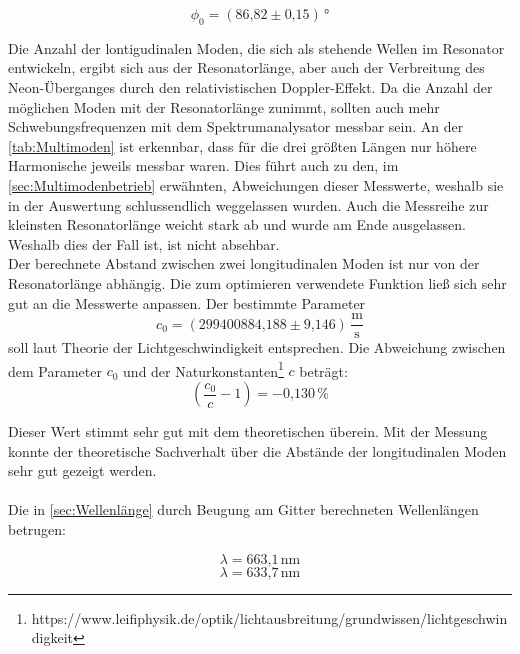 \begin{equation}
\phi_0 = (\text{86,82} \pm \text{0,15})\,\text{°}
\end{equation}


Die Anzahl der lontigudinalen Moden, die sich als stehende Wellen im Resonator entwickeln, ergibt sich aus der Resonatorlänge, aber auch der Verbreitung des Neon-Überganges durch den relativistischen Doppler-Effekt. Da die Anzahl der möglichen Moden mit der Resonatorlänge zunimmt, sollten auch mehr Schwebungsfrequenzen mit dem Spektrumanalysator messbar sein. An der \autoref{tab:Multimoden} ist erkennbar, dass für die drei größten Längen nur höhere Harmonische jeweils messbar waren. Dies führt auch zu den, im \autoref{sec:Multimodenbetrieb} erwähnten, Abweichungen dieser Messwerte, weshalb sie in der Auswertung schlussendlich weggelassen wurden. Auch die Messreihe zur kleinsten Resonatorlänge weicht stark ab und wurde am Ende ausgelassen. Weshalb dies der Fall ist, ist nicht absehbar.\\
Der berechnete Abstand zwischen zwei longitudinalen Moden ist nur von der Resonatorlänge abhängig. Die zum optimieren verwendete Funktion ließ sich sehr gut an die Messwerte anpassen. Der bestimmte Parameter
\begin{equation}
c_0 = (\text{299400884,188} \pm \text{9,146})\, \frac{\text{m}}{\text{s}}
\end{equation}
soll laut Theorie der Lichtgeschwindigkeit entsprechen. Die Abweichung zwischen dem Parameter $c_0$ und der Naturkonstanten\footnote{https://www.leifiphysik.de/optik/lichtausbreitung/grundwissen/lichtgeschwindigkeit} $c$ beträgt:
\begin{equation}
(\frac{c_0}{c} -1)= -\text{0,130}\,\%
\end{equation}

Dieser Wert stimmt sehr gut mit dem theoretischen überein. Mit der Messung konnte der theoretische Sachverhalt über die Abstände der longitudinalen Moden sehr gut gezeigt werden.\\
\\
Die in \autoref{sec:Wellenlänge} durch Beugung am Gitter berechneten Wellenlängen betrugen:

\begin{equation}
\lambda = \text{663,1}\,\text{nm}
\label{eq:diskussionlambda1}
\end{equation}
\begin{equation}
\lambda = \text{633,7}\,\text{nm}
\label{eq:diskussionlambda2}
\end{equation}

